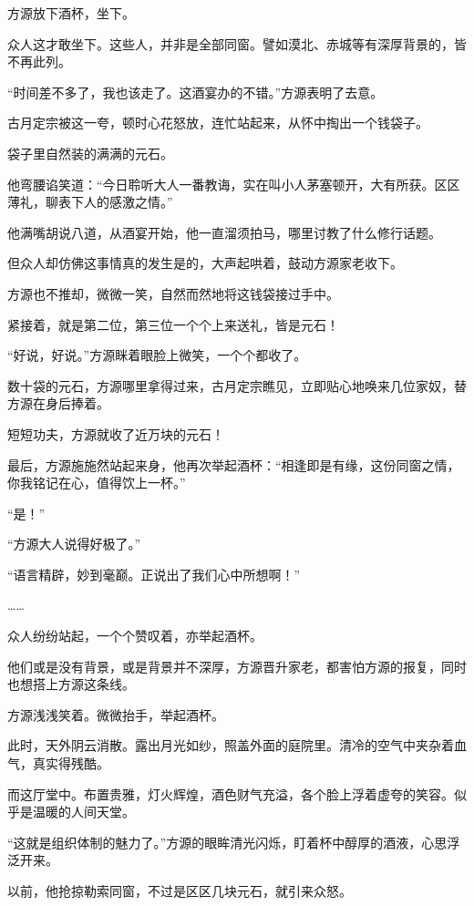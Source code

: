 
\begin{this_body}

方源放下酒杯，坐下。

众人这才敢坐下。这些人，并非是全部同窗。譬如漠北、赤城等有深厚背景的，皆不再此列。

“时间差不多了，我也该走了。这酒宴办的不错。”方源表明了去意。

古月定宗被这一夸，顿时心花怒放，连忙站起来，从怀中掏出一个钱袋子。

袋子里自然装的满满的元石。

他弯腰谄笑道：“今日聆听大人一番教诲，实在叫小人茅塞顿开，大有所获。区区薄礼，聊表下人的感激之情。”

他满嘴胡说八道，从酒宴开始，他一直溜须拍马，哪里讨教了什么修行话题。

但众人却仿佛这事情真的发生是的，大声起哄着，鼓动方源家老收下。

方源也不推却，微微一笑，自然而然地将这钱袋接过手中。

紧接着，就是第二位，第三位一个个上来送礼，皆是元石！

“好说，好说。”方源眯着眼脸上微笑，一个个都收了。

数十袋的元石，方源哪里拿得过来，古月定宗瞧见，立即贴心地唤来几位家奴，替方源在身后捧着。

短短功夫，方源就收了近万块的元石！

最后，方源施施然站起来身，他再次举起酒杯：“相逢即是有缘，这份同窗之情，你我铭记在心，值得饮上一杯。”

“是！”

“方源大人说得好极了。”

“语言精辟，妙到毫巅。正说出了我们心中所想啊！”

……

众人纷纷站起，一个个赞叹着，亦举起酒杯。

他们或是没有背景，或是背景并不深厚，方源晋升家老，都害怕方源的报复，同时也想搭上方源这条线。

方源浅浅笑着。微微抬手，举起酒杯。

此时，天外阴云消散。露出月光如纱，照盖外面的庭院里。清冷的空气中夹杂着血气，真实得残酷。

而这厅堂中。布置贵雅，灯火辉煌，酒色财气充溢，各个脸上浮着虚夸的笑容。似乎是温暖的人间天堂。

“这就是组织体制的魅力了。”方源的眼眸清光闪烁，盯着杯中醇厚的酒液，心思浮泛开来。

以前，他抢掠勒索同窗，不过是区区几块元石，就引来众怒。


\end{this_body}
